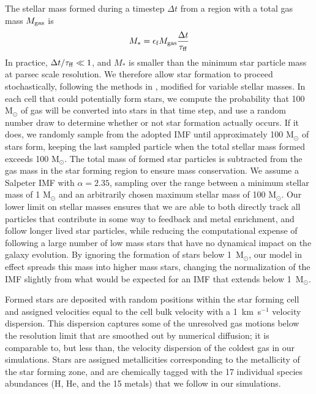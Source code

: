 The stellar mass formed during a timestep $\Delta t$ from a region with a total gas mass $M_{\rm gas}$ is
\begin{equation}
         M_* = \epsilon_{\rm f} M_{\rm gas} \frac{\Delta t}{\tau_{\rm ff}}
\end{equation}
In practice, $\Delta t/\tau_{\rm ff} \ll 1$, and $M_*$ is smaller than the minimum star particle mass at parsec scale resolution. We therefore allow star formation to proceed stochastically, following the methods in \citet{Goldbaum2015, Goldbaum2016}, modified for variable stellar masses. In each cell that could potentially form stars, we compute the probability that 100 M$_{\odot}$ of gas will be converted into stars in that time step, and use a random number draw to determine whether or not star formation actually occurs. If it does, we randomly sample from
the adopted IMF until approximately 100 M$_{\odot}$ of stars form, keeping the last sampled particle when the total stellar mass formed exceeds 100 M$_{\odot}$. The total mass of formed star particles is subtracted from the gas mass in the star forming region to ensure mass conservation. We assume a Salpeter IMF \citep{Salpeter1955} with $\alpha = 2.35$, sampling over the range between a minimum stellar mass of 1 M$_{\odot}$ and an arbitrarily chosen maximum stellar mass of 100 M$_{\odot}$. Our lower limit on stellar masses ensures that we are able to both directly track all particles that contribute in some way to feedback and metal enrichment, and follow longer lived star particles, while reducing the computational expense of following a large number of low mass stars that have no dynamical impact on the galaxy evolution. By ignoring the formation of stars below 1~M$_{\odot}$, our model in effect spreads this mass into higher mass stars, changing the normalization of the IMF slightly from what would be expected for an IMF that extends below  1~M$_{\odot}$.

Formed stars are deposited with random positions within the star forming cell and assigned velocities equal to the cell bulk velocity with a 1~km~s$^{-1}$ velocity dispersion. This dispersion captures some of the unresolved gas motions below the resolution limit that are smoothed out by numerical diffusion; it is comparable to, but less than, the velocity dispersion of the coldest gas in our simulations. Stars are assigned metallicities corresponding to the metallicity of the star forming zone, and are chemically tagged with the 17 individual species abundances (H, He, and the 15 metals) that we follow in our simulations.

